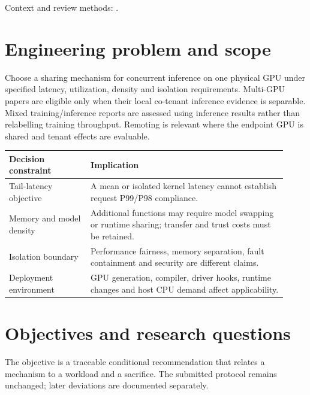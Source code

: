 \documentclass[12pt,a4paper]{article}
\begin{document}
Context and review methods: \cite{nvidiaMPS,nvidiaMIG,nvidiaTime,kitchenham,prisma,prismas}.

\section{Engineering problem and scope}

Choose a sharing mechanism for concurrent inference on one physical GPU under specified latency, utilization, density and isolation requirements. Multi-GPU papers are eligible only when their local co-tenant inference evidence is separable. Mixed training/\allowbreak{}inference reports are assessed using inference results rather than relabelling training throughput. Remoting is relevant where the endpoint GPU is shared and tenant effects are evaluable.



{\small\begin{longtable}{>{\raggedright\arraybackslash}p{0.27\linewidth}>{\raggedright\arraybackslash}p{0.65\linewidth}}
\toprule
Decision constraint & Implication\\\midrule
\endhead
Tail-latency objective & A mean or isolated kernel latency cannot establish request P99/\allowbreak{}P98 compliance.\\
Memory and model density & Additional functions may require model swapping or runtime sharing; transfer and trust costs must be retained.\\
Isolation boundary & Performance fairness, memory separation, fault containment and security are different claims.\\
Deployment environment & GPU generation, compiler, driver hooks, runtime changes and host CPU demand affect applicability.\\
\bottomrule
\end{longtable}}


\section{Objectives and research questions}

The objective is a traceable conditional recommendation that relates a mechanism to a workload and a sacrifice. The submitted protocol remains unchanged; later deviations are documented separately.
\end{document}

